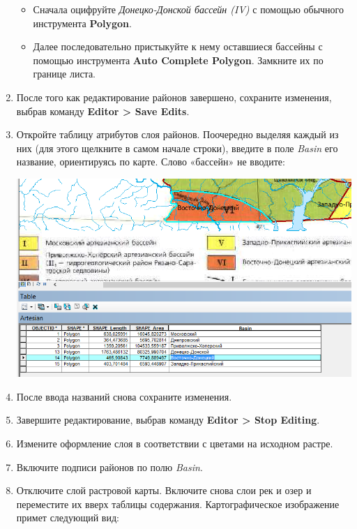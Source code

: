 \documentclass[12pt,]{book}
\begin{document}
\begin{enumerate}
  \begin{itemize}
  \item
    Сначала оцифруйте \emph{Донецко-Донской бассейн (IV)} с помощью обычного инструмента \textbf{Polygon}.
  \item
    Далее последовательно пристыкуйте к нему оставшиеся бассейны с помощью инструмента \textbf{Auto Complete Polygon}. Замкните их по границе листа.
  \end{itemize}
\item
  После того как редактирование районов завершено, сохраните изменения, выбрав команду \textbf{Editor \textgreater{} Save Edits}.
\item
  Откройте таблицу атрибутов слоя районов. Поочередно выделяя каждый из них (для этого щелкните в самом начале строки), введите в поле \emph{Basin} его название, ориентируясь по карте. Слово «бассейн» не вводите:

  \includegraphics{images/Ex06/image13.png}
\item
  После ввода названий снова сохраните изменения.
\item
  Завершите редактирование, выбрав команду \textbf{Editor \textgreater{} Stop Editing}.
\item
  Измените оформление слоя в соответствии с цветами на
  исходном растре.
\item
  Включите подписи районов по полю \emph{Basin}.
\item
  Отключите слой растровой карты. Включите снова слои рек и озер и
  переместите их вверх таблицы содержания. Картографическое
  изображение примет следующий вид:


\end{enumerate}
\end{document}
